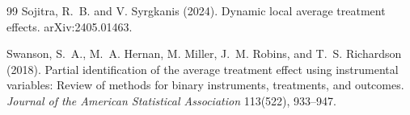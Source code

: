 \documentclass[11pt]{article}
\theoremstyle{definition}
\theoremstyle{plain}
\theoremstyle{remark}
\begin{document}
\begin{thebibliography}{99}
Sojitra, R.~B. and V. Syrgkanis (2024).
\newblock Dynamic local average treatment effects.
\newblock arXiv:2405.01463.

Swanson, S.~A., M.~A. Hernan, M. Miller, J.~M. Robins, and T.~S. Richardson (2018).
\newblock Partial identification of the average treatment effect using instrumental variables: Review of methods for binary instruments, treatments, and outcomes.
\newblock \emph{Journal of the American Statistical Association} 113(522), 933--947.
\end{thebibliography}
\end{document}
